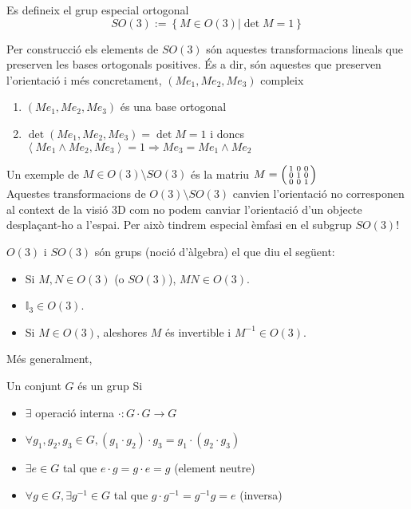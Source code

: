 \documentclass[a4paper,12pt]{article}
\begin{document}
	\begin{definicio}
	    Es defineix el grup especial ortogonal
	    \begin{displaymath}
	        SO(3) := \left\{M \in O(3) | \det{M} = 1\right\}
	    \end{displaymath}
	\end{definicio}

	Per construcció els elements de $SO(3)$ són aquestes transformacions lineals que preserven les
	bases ortogonals positives. És a dir, són aquestes que preserven l'orientació i més concretament,
	$\left(Me_1, Me_2, Me_3\right)$ compleix

	\begin{enumerate}
	    \item $\left(Me_1, Me_2, Me_3\right)$ és una base ortogonal
	    \item $\det{\left(Me_1, Me_2, Me_3\right)} = \det{M} = 1$ i doncs $\left\langle Me_1\wedge Me_2, Me_3\right\rangle = 1 \Rightarrow Me_3 = Me_1\wedge Me_2$
	\end{enumerate}

	Un exemple de $M \in O(3)\setminus SO(3)$ és la matriu $M = \begin{psmallmatrix}
	    1 & 0 & 0\\
	    0 & 1 & 0\\
	    0 & 0 & 1
	\end{psmallmatrix}$\\

	Aquestes transformacions de $O(3)\setminus SO(3)$ canvien l'orientació no corresponen al context de
	la visió 3D com no podem canviar l'orientació d'un objecte desplaçant-ho a l'espai. Per això tindrem
	especial èmfasi en el subgrup $SO(3)$!

	\begin{obs}
	    $O(3)$ i $SO(3)$ són grups (noció d'àlgebra) el que diu el següent:
	    \begin{itemize}
	        \item Si $M, N \in O(3)$ (o $SO(3)$), $MN \in O(3)$.
	        \item $\mathbb{I}_3 \in O(3)$.
	        \item Si $M \in O(3)$, aleshores $M$ és invertible i $M^{-1} \in O(3)$.
	    \end{itemize}
	\end{obs}
	Més generalment,
	\begin{definicio}
	    Un conjunt $G$ és un grup Si
	    \begin{itemize}
	        \item $\exists$ operació interna $\cdot : G\cdot G \to G$
	        \item $\forall g_1, g_2, g_3 \in G, (g_1\cdot g_2) \cdot g_3 = g_1\cdot (g_2 \cdot g_3)$
	        \item $\exists e \in G$ tal que $e\cdot g = g \cdot e = g$ (element neutre)
	        \item $\forall g \in G, \exists g^{-1} \in G$ tal que $ g\cdot g^{-1} = g^{-1}g = e$ (inversa)
	    \end{itemize}
	\end{definicio}
\end{document}
